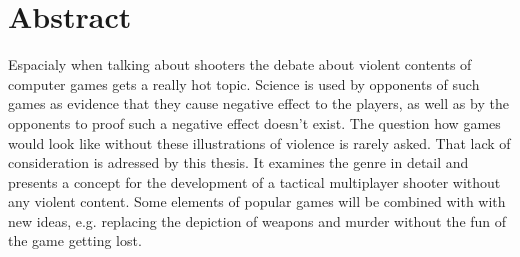 \chapter*{Abstract}

Espacialy when talking about shooters the debate about violent contents of computer games gets a really hot topic.
Science is used by opponents of such games as evidence that they cause negative effect to the players, as well as by the
opponents to proof such a negative effect doesn't exist. The question how games would look like without these
illustrations of violence is rarely asked. That lack of consideration is adressed by this thesis. It examines the genre
in detail and presents a concept for the development of a tactical multiplayer shooter without any violent content. Some
elements of popular games will be combined with with new ideas, e.g. replacing the depiction of weapons and murder
without the fun of the game getting lost.
